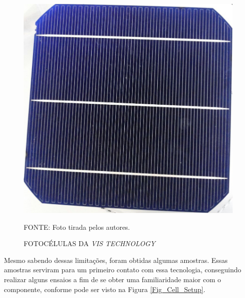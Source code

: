 \documentclass[
	12pt,				%
	openright,			%
	oneside,			%
	a4paper,			%
	english,			%
	french,				%
	spanish,			%
	brazil,				%
	oldfontcommands
	]{abntex2}
\begin{document}
	\begin{figure}[th]
		\caption{FOTOCÉLULAS DA \textit{VIS TECHNOLOGY}}
		\label{Fig_Cell_Vis}
		\centering
		\includegraphics[width=0.6\linewidth]{./figs/cell_vis}
			
		\begin{small}
			FONTE: Foto tirada pelos autores.
		\end{small}		
	\end{figure}
	
	Mesmo sabendo dessas limitações, foram obtidas algumas amostras. Essas amostras serviram para um primeiro contato com essa tecnologia, conseguindo realizar alguns ensaios a fim de se obter uma familiaridade maior com o componente, conforme pode ser visto na Figura \ref{Fig_Cell_Setup}.
	
\end{document}
